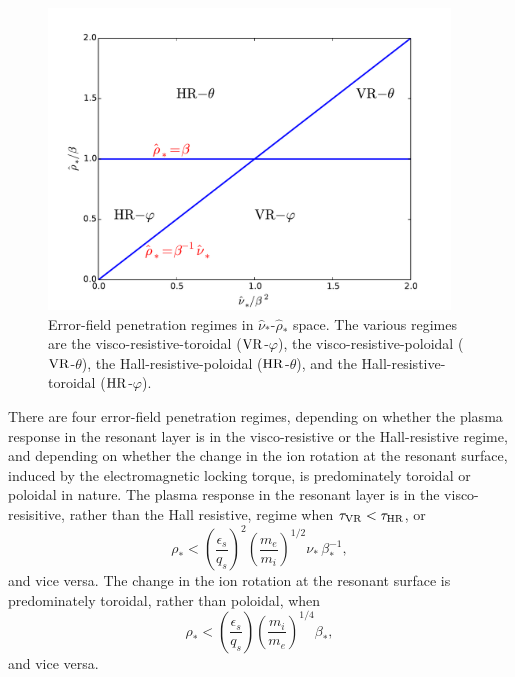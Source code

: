 \documentclass[notitlepage,12pt]{article}
\begin{document}
\begin{figure}[t]
\centerline{\includegraphics[width=0.95\textwidth]{Scaling.pdf}}
\caption{Error-field penetration regimes in $\hat{\nu}_\ast$-$\hat{\rho}_\ast$ space. The various regimes are the
visco-resistive-toroidal (${\rm VR}$-$\varphi$), the visco-resistive-poloidal (${\rm VR}$-$\theta$), the Hall-resistive-poloidal (${\rm HR}$-$\theta$), and the  Hall-resistive-toroidal (${\rm HR}$-$\varphi$). }\label{f6}
\end{figure}

There are four error-field penetration regimes, depending on whether the plasma response in the resonant layer is
in the visco-resistive or the Hall-resistive regime, and depending on whether the change in the ion rotation at the resonant surface, induced by the electromagnetic locking torque,  is
predominately toroidal or poloidal in nature. The plasma response in the resonant layer is in the
visco-resisitive, rather than the Hall resistive, regime when $\tau_{\rm VR}<\tau_{\rm HR}$, or
\begin{equation}
\rho_\ast < \left(\frac{\epsilon_s}{q_s}\right)^2\left(\frac{m_e}{m_i}\right)^{1/2}\nu_\ast\,\beta_\ast^{-1},
\end{equation}
and vice versa. The change in the ion rotation at the resonant surface is predominately toroidal, rather than poloidal, when
\begin{equation}
\rho_\ast < \left(\frac{\epsilon_s}{q_s}\right)\left(\frac{m_i}{m_e}\right)^{1/4}\beta_\ast,
\end{equation}
and vice versa. 
\end{document}
